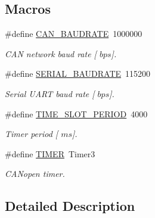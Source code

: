 \subsection*{Macros}
\begin{DoxyCompactItemize}
\item 
\mbox{\label{group___common__defines__group_gaa75b7ce1cd135619656735399baf3768}} 
\#define \mbox{\hyperlink{group___common__defines__group_gaa75b7ce1cd135619656735399baf3768}{C\+A\+N\+\_\+\+B\+A\+U\+D\+R\+A\+TE}}~1000000
\begin{DoxyCompactList}\small\item\em C\+AN network baud rate \mbox{[} $bps$\mbox{]}. \end{DoxyCompactList}\item 
\mbox{\label{group___common__defines__group_ga89f82a9d44beaa52b00c7245a50a105c}} 
\#define \mbox{\hyperlink{group___common__defines__group_ga89f82a9d44beaa52b00c7245a50a105c}{S\+E\+R\+I\+A\+L\+\_\+\+B\+A\+U\+D\+R\+A\+TE}}~115200
\begin{DoxyCompactList}\small\item\em Serial U\+A\+RT baud rate \mbox{[} $bps$\mbox{]}. \end{DoxyCompactList}\item 
\mbox{\label{group___common__defines__group_ga09c95853fd002fab968d94c5bc44e823}} 
\#define \mbox{\hyperlink{group___common__defines__group_ga09c95853fd002fab968d94c5bc44e823}{T\+I\+M\+E\+\_\+\+S\+L\+O\+T\+\_\+\+P\+E\+R\+I\+OD}}~4000
\begin{DoxyCompactList}\small\item\em Timer period \mbox{[} $ms$\mbox{]}. \end{DoxyCompactList}\item 
\mbox{\label{group___common__defines__group_ga599217205dc3092c26567a2bd868ef3a}} 
\#define \mbox{\hyperlink{group___common__defines__group_ga599217205dc3092c26567a2bd868ef3a}{T\+I\+M\+ER}}~Timer3
\begin{DoxyCompactList}\small\item\em C\+A\+Nopen timer. \end{DoxyCompactList}\end{DoxyCompactItemize}


\subsection{Detailed Description}
